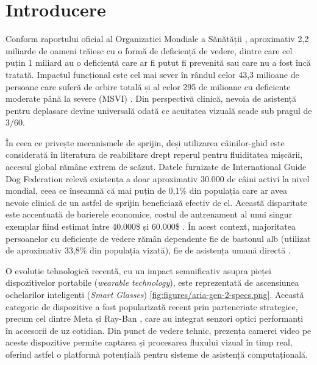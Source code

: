 \chapter{Introducere}

\label{intro}

\par Conform raportului oficial al Organizației Mondiale a Sănătății \cite{who2019}, aproximativ 2,2 miliarde de oameni trăiesc cu o formă de deficiență de vedere, dintre care cel puțin 1 miliard au o deficiență care ar fi putut fi prevenită sau care nu a fost încă tratată. Impactul funcțional este cel mai sever în rândul celor 43,3 milioane de persoane care suferă de orbire totală și al celor 295 de milioane cu deficiențe moderate până la severe (MSVI) \cite{vleg2021}. Din perspectivă clinică, nevoia de asistență pentru deplasare devine universală odată ce acuitatea vizuală scade sub pragul de $3/60$.

În ceea ce privește mecanismele de sprijin, deși utilizarea câinilor-ghid este considerată în literatura de reabilitare drept reperul pentru fluiditatea mișcării, accesul global rămâne extrem de scăzut. Datele furnizate de International Guide Dog Federation \cite{igdf2023} relevă existența a doar aproximativ 30.000 de câini activi la nivel mondial, ceea ce înseamnă că mai puțin de 0,1\% din populația care ar avea nevoie clinică de un astfel de sprijin beneficiază efectiv de el. Această disparitate este accentuată de barierele economice, costul de antrenament al unui singur exemplar fiind estimat între 40.000\$ și 60.000\$ \cite{cost2018}. În acest context, majoritatea persoanelor cu deficiențe de vedere rămân dependente fie de bastonul alb (utilizat de aproximativ 33,8\% din populația vizată), fie de asistența umană directă \cite{nature2021}.

O evoluție tehnologică recentă, cu un impact semnificativ asupra pieței dispozitivelor portabile (\textit{wearable technology}), este reprezentată de ascensiunea ochelarilor inteligenți (\textit{Smart Glasses}) \ref{fig:figures/aria-gen-2-specs.png}. Această categorie de dispozitive a fost popularizată recent prin parteneriate strategice, precum cel dintre Meta și Ray-Ban \cite{metarayban}, care au integrat senzori optici performanți în accesorii de uz cotidian. Din punct de vedere tehnic, prezența camerei video pe aceste dispozitive permite captarea și procesarea fluxului vizual în timp real, oferind astfel o platformă potențială pentru sisteme de asistență computațională.

